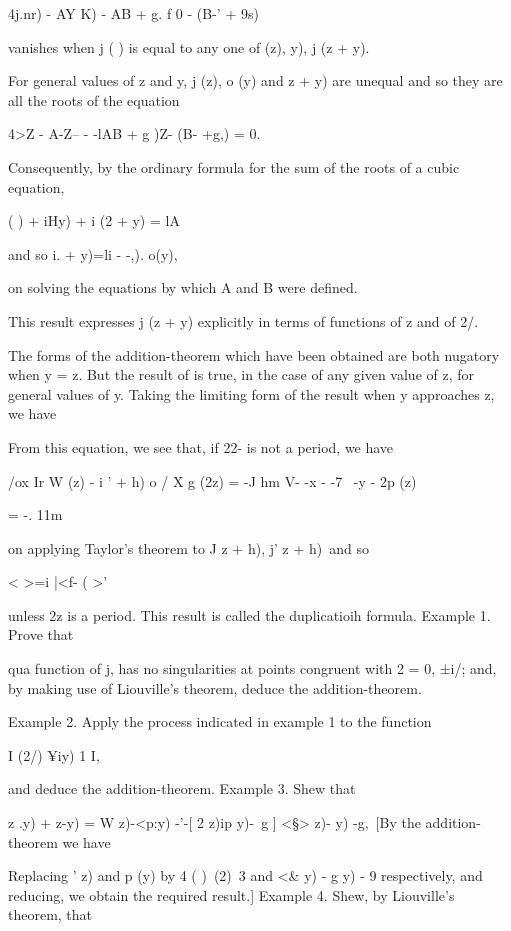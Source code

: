 {4j.nr) - AY K) - AB + g. f 0 - (B-' + 9s)

vanishes when j ( ) is equal to any one of (z), y), j (z + y).

For general values of z and y, j (z), o (y) and z + y) are unequal and
so they are all the roots of the equation

4>Z - A-Z-- - -lAB + g )Z- (B- +g,) = 0.

Consequently, by the ordinary formula for the sum of the roots of a
cubic equation,

 ( ) + iHy) + i (2 + y) = lA%

and so i. + y)=li - -,). o(y),

on solving the equations by which A and B were defined.

This result expresses j (z + y) explicitly in terms of functions of z
and of 2/.


The forms of the addition-theorem which have been obtained are both
nugatory when y = z. But the result of  is true, in the case of
any given value of z, for general values of y. Taking the limiting
form of the result when y approaches z, we have

From this equation, we see that, if 22- is not a period, we have

/ox Ir W (z) - i ' + h) o / X g (2z) = -J hm V- -x - -7 ~-y - 2p (z)

= -. 11m

on applying Taylor's theorem to J z + h), j' z + h)\ and so

 < >=i |<f- ( >'

unless 2z is a period. This result is called the duplicatioih formula.
Example 1. Prove that

qua function of j, has no singularities at points congruent with 2 =
0, ±i/; and, by making use of Liouville's theorem, deduce the
addition-theorem.

%
%

Example 2. Apply the process indicated in example 1 to the function

I (2/) ¥iy) 1 I,

and deduce the addition-theorem. Example 3. Shew that

  z .y) + z-y) = W z)-<p:y) -'-[ 2 z)ip y)-\ g ] <§> z)- y) -g,\ [By
the addition-theorem we have

Replacing ' z) and p (y) by 4 ( )\ (2)\ 3 and <\& y) - g y) - 9
respectively, and reducing, we obtain the required result.] Example
4. Shew, by Liouville's theorem, that

}
